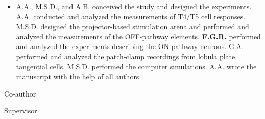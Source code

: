 \begin{itemize}
    \begin{itemize}
        \item
        A.A., M.S.D., and A.B. conceived the study and designed the experiments. A.A. conducted and analyzed the measurements of T4/T5 cell  responses. M.S.D.
        designed the projector-based stimulation arena and performed and analyzed the measurements of the OFF-pathway elements. \textbf{F.G.R.} performed and analyzed the experiments describing the ON-pathway neurons. G.A. performed and analyzed the patch-clamp recordings from lobula plate tangential cells. M.S.D. performed the computer simulations. A.A. wrote the manuscript with the help of all authors.
    \end{itemize}
    
    
    
\end{itemize}

\vspace{15mm}

  \begin{minipage}[t]{0.5\linewidth}
  \end{minipage}
  \begin{minipage}[t]{0.5\linewidth}
    \raggedright
    \par
    Co-author
  \end{minipage}%
  
  \vspace{5mm}
  
    \begin{minipage}[t]{0.5\linewidth}
    \par 
    Supervisor
  \end{minipage}

\newpage